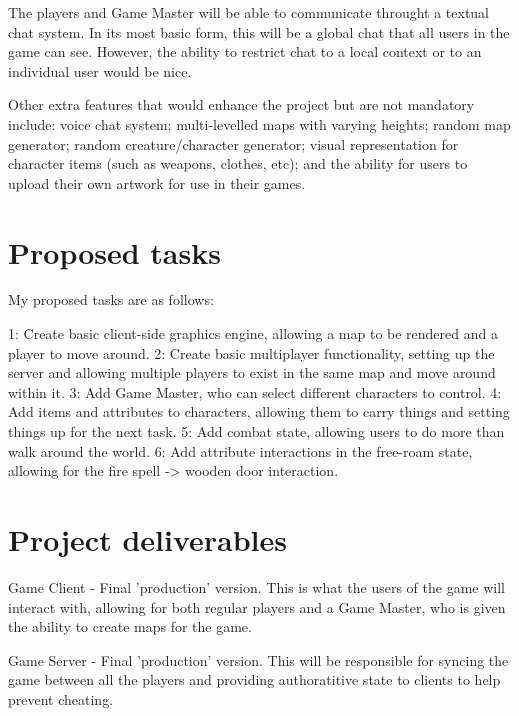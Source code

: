\documentclass[11pt,fleqn,twoside]{article}
\begin{document}
The players and Game Master will be able to communicate throught a textual chat system. In its most basic form, this will be a global chat that all users in the game can see. However, the ability to restrict chat to a local context or to an individual user would be nice.

Other extra features that would enhance the project but are not mandatory include: voice chat system; multi-levelled maps with varying heights; random map generator; random creature/character generator; visual representation for character items (such as weapons, clothes, etc); and the ability for users to upload their own artwork for use in their games.

\section{Proposed tasks}
My proposed tasks are as follows:

1: Create basic client-side graphics engine, allowing a map to be rendered and a player to move around.
2: Create basic multiplayer functionality, setting up the server and allowing multiple players to exist in the same map and move around within it.
3: Add Game Master, who can select different characters to control.
4: Add items and attributes to characters, allowing them to carry things and setting things up for the next task.
5: Add combat state, allowing users to do more than walk around the world.
6: Add attribute interactions in the free-roam state, allowing for the fire spell -> wooden door interaction.

\section{Project deliverables}
Game Client - Final 'production' version. This is what the users of the game will interact with, allowing for both regular players and a Game Master, who is given the ability to create maps for the game.

Game Server - Final 'production' version. This will be responsible for syncing the game between all the players and providing authoratitive state to clients to help prevent cheating.
\end{document}
